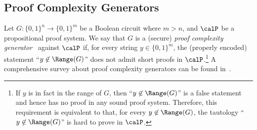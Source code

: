 \subsection{Proof Complexity Generators}

Let $G: \{0, 1\}^n \to \{0, 1\}^m$ be a Boolean circuit where $m > n$, and $\calP$ be a propositional proof system. We say that $G$ is a (secure) \emph{proof complexity generator}~\cite{ABRW04, krajivcek2001weak} against $\calP$ if, for every string $y \in \{0, 1\}^m$, the (properly encoded) statement ``$y \not\in \Range(G)$'' does not admit short proofs in $\calP$.\footnote{If $y$ is in fact in the range of $G$, then ``$y\not\in\Range(G)$'' is a false statement and hence has no proof in any sound proof system. Therefore, this requirement is equivalent to that, for every $y\not\in\Range(G)$, the tautology ``$y\not\in\Range(G)$'' is hard to prove in $\calP$.} A comprehensive survey about proof complexity generators can be found in~\cite{Krajicek-generator-book}.

